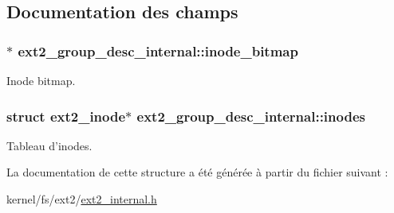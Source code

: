 \subsection{Documentation des champs}
\hypertarget{structext2__group__desc__internal_a5b3cee6954ef4ed21c238b46d389b9bf}{
\subsubsection[{inode\+\_\+bitmap}]{$\ast$ ext2\+\_\+group\+\_\+desc\+\_\+internal\+::inode\+\_\+bitmap}}\label{structext2__group__desc__internal_a5b3cee6954ef4ed21c238b46d389b9bf}
Inode bitmap. \hypertarget{structext2__group__desc__internal_a690f836bfb2c8de04ae2b1753134f8a7}{
\subsubsection[{inodes}]{\setlength{\rightskip}{0pt plus 5cm}struct {\bf ext2\+\_\+inode}$\ast$ ext2\+\_\+group\+\_\+desc\+\_\+internal\+::inodes}}\label{structext2__group__desc__internal_a690f836bfb2c8de04ae2b1753134f8a7}
Tableau d'inodes. 

La documentation de cette structure a été générée à partir du fichier suivant \+:\begin{DoxyCompactItemize}
\item 
kernel/fs/ext2/\hyperlink{ext2__internal_8h}{ext2\+\_\+internal.\+h}\end{DoxyCompactItemize}
